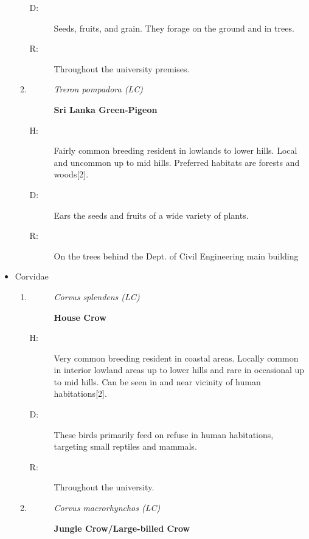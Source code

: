 \begin{itemize}
\begin{enumerate}
\begin{description}
\item[D: ]%
Seeds, fruits, and grain. They forage on the ground and in trees.%
\item[R: ]%
Throughout the university premises.%
\end{description}%
\item%
\begin{description}%
\item[]%
\textit{Treron pompadora (LC)}%
\item[]%
\textbf{Sri Lanka Green{-}Pigeon}%
\end{description}%
\begin{description}%
\item[H: ]%
Fairly common breeding resident in lowlands to lower hills. Local and uncommon up to mid hills. Preferred habitats are forests and woods{[}2{]}.%
\item[D: ]%
 Ears the seeds and fruits of a wide variety of plants.%
\item[R: ]%
On the trees behind the Dept. of Civil Engineering main building%
\end{description}%
\end{enumerate}%
\item%
Corvidae%
\begin{enumerate}%
\item%
\begin{description}%
\item[]%
\textit{Corvus splendens (LC)}%
\item[]%
\textbf{House Crow}%
\end{description}%
\begin{description}%
\item[H: ]%
Very common breeding resident in coastal areas. Locally common in interior lowland areas up to lower hills and rare in occasional up to mid hills. Can be seen in and near vicinity of human habitations{[}2{]}.%
\item[D: ]%
These birds primarily feed on refuse in human habitations, targeting small reptiles and mammals. %
\item[R: ]%
Throughout the university. %
\end{description}%
\item%
\begin{description}%
\item[]%
\textit{Corvus macrorhynchos (LC)}%
\item[]%
\textbf{Jungle Crow/Large{-}billed Crow}%
\end{description}%
\begin{description}%

\end{description}
\end{enumerate}
\end{itemize}
